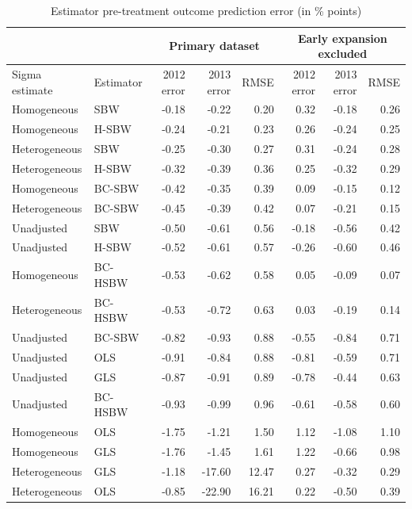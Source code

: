 \begin{table}
    \centering
\begin{threeparttable}\caption{Estimator pre-treatment outcome prediction error (in \% points)}\label{tab:pretxpredfull}
\begin{tabular}{llrrr|rrr}\\ \hline
 &  & \multicolumn{3}{c}{Primary dataset} & \multicolumn{3}{c}{Early expansion 
 excluded} \\
 \hline
Sigma estimate & Estimator & 2012 error & 2013 error & RMSE & 2012 error & 2013 error & RMSE \\ 
\hline
Homogeneous & SBW & -0.18 & -0.22 & 0.20 & 0.32 & -0.18 & 0.26 \\ 
Homogeneous & H-SBW & -0.24 & -0.21 & 0.23 & 0.26 & -0.24 & 0.25 \\ 
Heterogeneous & SBW & -0.25 & -0.30 & 0.27 & 0.31 & -0.24 & 0.28 \\ 
Heterogeneous & H-SBW & -0.32 & -0.39 & 0.36 & 0.25 & -0.32 & 0.29 \\ 
Homogeneous & BC-SBW & -0.42 & -0.35 & 0.39 & 0.09 & -0.15 & 0.12 \\ 
Heterogeneous & BC-SBW & -0.45 & -0.39 & 0.42 & 0.07 & -0.21 & 0.15 \\ 
Unadjusted & SBW & -0.50 & -0.61 & 0.56 & -0.18 & -0.56 & 0.42 \\ 
Unadjusted & H-SBW & -0.52 & -0.61 & 0.57 & -0.26 & -0.60 & 0.46 \\ 
Homogeneous & BC-HSBW & -0.53 & -0.62 & 0.58 & 0.05 & -0.09 & 0.07 \\ 
Heterogeneous & BC-HSBW & -0.53 & -0.72 & 0.63 & 0.03 & -0.19 & 0.14 \\ 
Unadjusted & BC-SBW & -0.82 & -0.93 & 0.88 & -0.55 & -0.84 & 0.71 \\ 
Unadjusted & OLS & -0.91 & -0.84 & 0.88 & -0.81 & -0.59 & 0.71 \\ 
Unadjusted & GLS & -0.87 & -0.91 & 0.89 & -0.78 & -0.44 & 0.63 \\ 
Unadjusted & BC-HSBW & -0.93 & -0.99 & 0.96 & -0.61 & -0.58 & 0.60 \\ 
Homogeneous & OLS & -1.75 & -1.21 & 1.50 & 1.12 & -1.08 & 1.10 \\ 
Homogeneous & GLS & -1.76 & -1.45 & 1.61 & 1.22 & -0.66 & 0.98 \\ 
Heterogeneous & GLS & -1.18 & -17.60 & 12.47 & 0.27 & -0.32 & 0.29 \\ 
Heterogeneous & OLS & -0.85 & -22.90 & 16.21 & 0.22 & -0.50 & 0.39 \\ 
 \hline
 \end{tabular}
\end{threeparttable}
\end{table}

